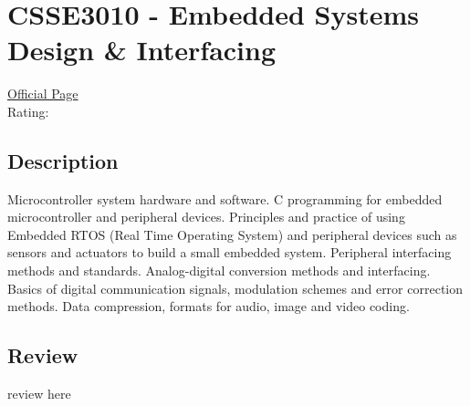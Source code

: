 \hypertarget{CSSE3010}{\section{CSSE3010 - Embedded Systems Design \& Interfacing}}

\large
\textcolor{turbo_purple}{\href{https://my.uq.edu.au/programs-courses/course.html?course_code=CSSE3010}{Official Page}} \\
Rating: \cstar\cstar\cstar\cstar\ostar

\normalsize
\subsection*{Description}
Microcontroller system hardware and software.
C programming for embedded microcontroller and peripheral devices.
Principles and practice of using Embedded RTOS (Real Time Operating System) and peripheral devices such as sensors and actuators to build a small embedded system.
Peripheral interfacing methods and standards. Analog-digital conversion methods and interfacing. Basics of digital communication signals, modulation schemes and error correction methods.
Data compression, formats for audio, image and video coding.

\subsection*{Review}
review here
